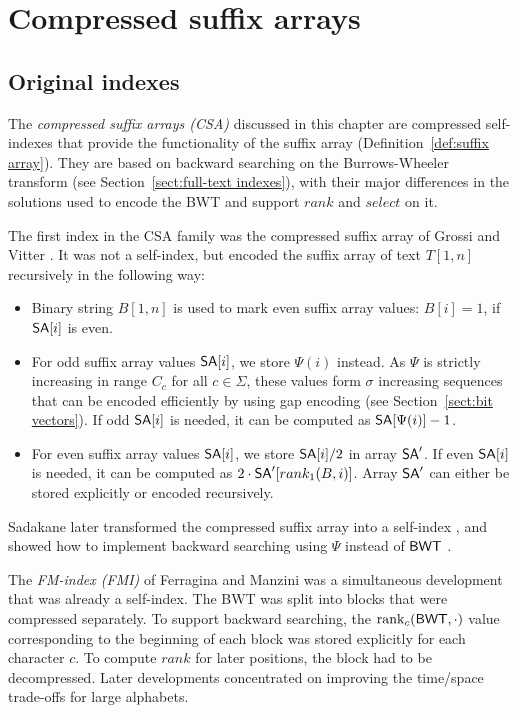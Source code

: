 \chapter{Compressed suffix arrays}\label{chapter:csa}

\section{Original indexes}\label{sect:original indexes}

The \emph{compressed suffix arrays (CSA)} discussed in this chapter are compressed self-indexes that provide the functionality of the suffix array (Definition~\ref{def:suffix array}). They are based on backward searching on the Burrows-Wheeler transform (see Section~\ref{sect:full-text indexes}), with their major differences in the solutions used to encode the BWT and support $rank$ and $select$ on it.

The first index in the CSA family was the compressed suffix array of Grossi and Vitter \cite{Grossi2005}. It was not a self-index, but encoded the suffix array of text $T[1,n]$ recursively in the following way:
\begin{itemize}

\item Binary string $B[1,n]$ is used to mark even suffix array values: $B[i] = 1$, if $\mathsf{SA}[i]$ is even.

\item For odd suffix array values $\mathsf{SA}[i]$, we store $\Psi(i)$ instead. As $\Psi$ is strictly increasing in range $C_{c}$ for all $c \in \Sigma$, these values form $\sigma$ increasing sequences that can be encoded efficiently by using gap encoding (see Section~\ref{sect:bit vectors}). If odd $\mathsf{SA}[i]$ is needed, it can be computed as $\mathsf{SA}[\Psi(i)] - 1$.

\item For even suffix array values $\mathsf{SA}[i]$, we store $\mathsf{SA}[i] / 2$ in array $\mathsf{SA}'$. If even $\mathsf{SA}[i]$ is needed, it can be computed as $2 \cdot \mathsf{SA}'[rank_{1}(B, i)]$. Array $\mathsf{SA}'$ can either be stored explicitly or encoded recursively.

\end{itemize}
Sadakane later transformed the compressed suffix array into a self-index \cite{Sadakane2003}, and showed how to implement backward searching using $\Psi$ instead of $\mathsf{BWT}$ \cite{Sadakane2002}.

The \emph{FM-index (FMI)} of Ferragina and Manzini \cite{Ferragina2005a} was a simultaneous development that was already a self-index. The BWT was split into blocks that were compressed separately. To support backward searching, the $\operatorname{rank}_{c}(\mathsf{BWT}, \cdot)$ value corresponding to the beginning of each block was stored explicitly for each character $c$. To compute $rank$ for later positions, the block had to be decompressed. Later developments concentrated on improving the time/space trade-offs for large alphabets.

